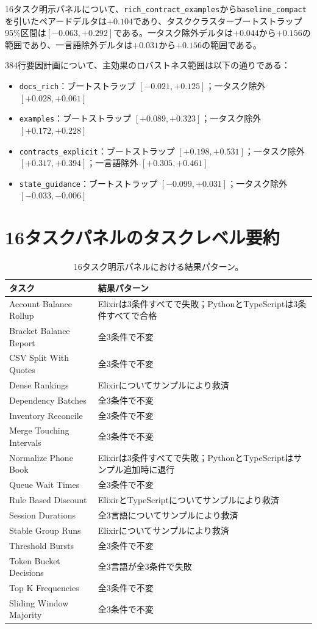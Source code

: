 \documentclass[11pt]{article}
\begin{document}
16タスク明示パネルについて、\texttt{rich\_contract\_examples}から\texttt{baseline\_compact}を引いたペアードデルタは$+0.104$であり、タスククラスターブートストラップ95\%区間は$[-0.063, +0.292]$である。一タスク除外デルタは$+0.044$から$+0.156$の範囲であり、一言語除外デルタは$+0.031$から$+0.156$の範囲である。

384行要因計画について、主効果のロバストネス範囲は以下の通りである：
\begin{itemize}
  \item \texttt{docs\_rich}：ブートストラップ $[-0.021, +0.125]$；一タスク除外 $[+0.028, +0.061]$
  \item \texttt{examples}：ブートストラップ $[+0.089, +0.323]$；一タスク除外 $[+0.172, +0.228]$
  \item \texttt{contracts\_explicit}：ブートストラップ $[+0.198, +0.531]$；一タスク除外 $[+0.317, +0.394]$；一言語除外 $[+0.305, +0.461]$
  \item \texttt{state\_guidance}：ブートストラップ $[-0.099, +0.031]$；一タスク除外 $[-0.033, -0.006]$
\end{itemize}

\section{16タスクパネルのタスクレベル要約}

\begin{table}[H]
\centering
\caption{16タスク明示パネルにおける結果パターン。}
\label{tab:paneltasks}
\small
\begin{tabularx}{\textwidth}{l X}
\toprule
タスク & 結果パターン \\
\midrule
Account Balance Rollup & Elixirは3条件すべてで失敗；PythonとTypeScriptは3条件すべてで合格 \\
Bracket Balance Report & 全3条件で不変 \\
CSV Split With Quotes & 全3条件で不変 \\
Dense Rankings & Elixirについてサンプルにより救済 \\
Dependency Batches & 全3条件で不変 \\
Inventory Reconcile & 全3条件で不変 \\
Merge Touching Intervals & 全3条件で不変 \\
Normalize Phone Book & Elixirは3条件すべてで失敗；PythonとTypeScriptはサンプル追加時に退行 \\
Queue Wait Times & 全3条件で不変 \\
Rule Based Discount & ElixirとTypeScriptについてサンプルにより救済 \\
Session Durations & 全3言語についてサンプルにより救済 \\
Stable Group Runs & Elixirについてサンプルにより救済 \\
Threshold Bursts & 全3条件で不変 \\
Token Bucket Decisions & 全3言語が全3条件で失敗 \\
Top K Frequencies & 全3条件で不変 \\
Sliding Window Majority & 全3条件で不変 \\
\bottomrule
\end{tabularx}
\end{table}
\end{document}
